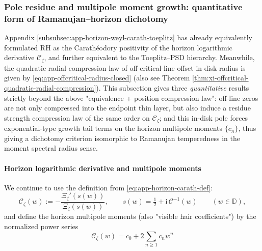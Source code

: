 \subsubsection{Pole residue and multipole moment growth: quantitative form of Ramanujan--horizon dichotomy}\label{subsubsec:xi-horizon-residue-multipole-temperedness}
Appendix \ref{subsubsec:app-horizon-weyl-carath-toeplitz} has already equivalently formulated RH as the Carath\'eodory positivity of the horizon logarithmic derivative
\(\mathscr{C}_{\zeta}\), and further equivalent to the Toeplitz--PSD hierarchy.
Meanwhile, the quadratic radial compression law of off-critical-line offset in disk radius is given by \eqref{eq:app-offcritical-radius-closed} (also see Theorem \ref{thm:xi-offcritical-quadratic-radial-compression}).
This subsection gives three \emph{quantitative} results strictly beyond the above "equivalence + position compression law": off-line zeros are not only compressed into the endpoint thin layer, but also induce a residue strength compression law of the same order on \(\mathscr{C}_{\zeta}\); and this in-disk pole forces exponential-type growth tail terms on the horizon multipole moments \(\{c_n\}\), thus giving a dichotomy criterion isomorphic to Ramanujan temperedness in the moment spectral radius sense.

\paragraph{Horizon logarithmic derivative and multipole moments}
We continue to use the definition from \eqref{eq:app-horizon-carath-def}:
\[
\mathscr{C}_{\zeta}(w):=-\frac{\Xi_{\zeta}'(s(w))}{\Xi_{\zeta}(s(w))},\qquad
s(w)=\tfrac12+\mathrm{i}\,\mathcal{C}^{-1}(w)\qquad(w\in\mathbb{D}),
\]
and define the horizon multipole moments (also "visible hair coefficients") by the normalized power series
\begin{equation}\label{eq:xi-horizon-carath-series-recall}
\mathscr{C}_{\zeta}(w)=c_0+2\sum_{n\ge 1}c_n w^n
\end{equation}

